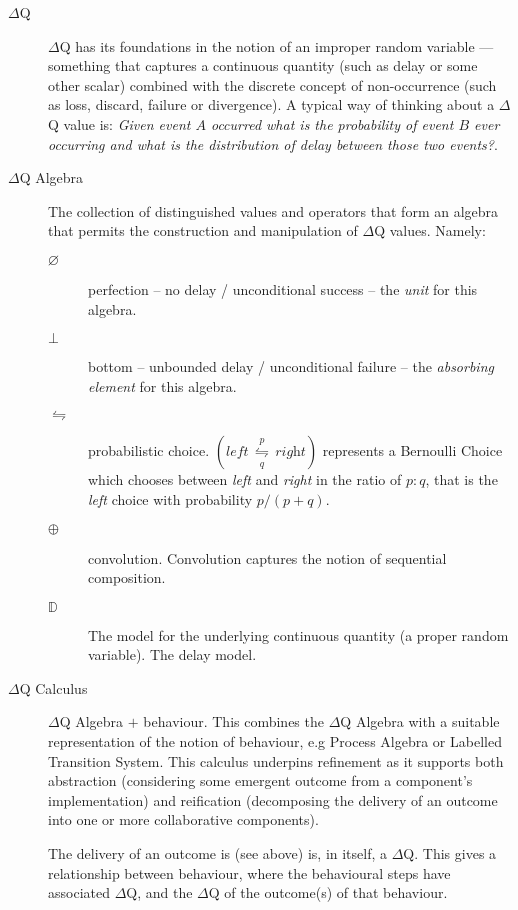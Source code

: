 \documentclass[11pt,a4paper]{article}
\begin{document}
\begin{description}
 \item[$\Delta$Q] $\Delta$Q has its foundations in the notion of an
   improper random variable --- something that captures a continuous
   quantity (such as delay or some other scalar) combined with the
   discrete concept of non-occurrence (such as loss, discard, failure
   or divergence).  A typical way of thinking about a $\Delta$Q value
   is: \textit{Given event $A$ occurred what is the probability of
     event $B$ ever occurring and what is the distribution of delay
     between those two events?}.
 \item[$\Delta$Q Algebra] The collection of distinguished values and
   operators that form an algebra that permits the construction and
   manipulation of $\Delta$Q values.  Namely:
    \begin{description}
    \item[$\varnothing$] perfection -- no delay / unconditional
      success -- the \emph{unit} for this algebra.
    \item[$\bot$] bottom -- unbounded delay / unconditional failure --
      the \emph{absorbing element} for this algebra.
    \item[$\leftrightharpoons$] probabilistic choice.
      $(\textit{left}\,\underset{q}{\overset{p}{{\leftrightharpoons}}}\,\textit{right})$
      represents a Bernoulli Choice which chooses between
      \textit{left} and \textit{right} in the ratio of $p:q$, that is
      the \textit{left} choice with probability $p/(p+q)$.
    \item[$\oplus$] convolution. Convolution captures the notion of
      sequential composition.
    \item[$\mathbb{D}$] The model for the underlying continuous
      quantity (a proper random variable). The delay model.
    \end{description}
 \item[$\Delta$Q Calculus] $\Delta$Q Algebra $+$ behaviour. This
   combines the $\Delta$Q Algebra with a suitable representation of
   the notion of behaviour, e.g Process Algebra or Labelled Transition
   System.  This calculus underpins refinement as it supports both
   abstraction (considering some emergent outcome from a component's
   implementation) and reification (decomposing the delivery of an
   outcome into one or more collaborative components).
      
   The delivery of an outcome is (see above) is, in itself, a
   $\Delta$Q. This gives a relationship between behaviour, where the
   behavioural steps have associated $\Delta$Q, and the $\Delta$Q of
   the outcome(s) of that behaviour.
      

\end{description}
\end{document}
